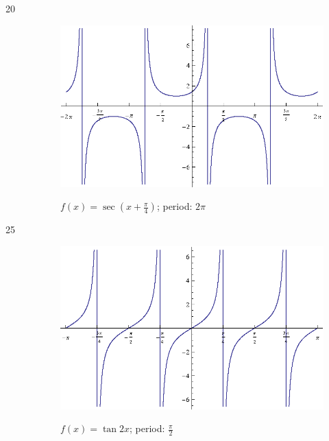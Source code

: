 \documentclass{exam}
\begin{document}
\begin{description}
      \item[20]
        \begin{figure}[H]
          \centering
          \includegraphics[scale=0.9]{exercise20.eps}

          $f(x) = \sec \left( x + \frac{\pi}{4} \right)$; period: $2 \pi$
        \end{figure}

      \item[25]
        \begin{figure}[H]
          \centering
          \includegraphics[scale=0.9]{exercise25.eps}

          $f(x) = \tan 2x$; period: $\frac{\pi}{2}$
        \end{figure}


\end{description}
\end{document}
